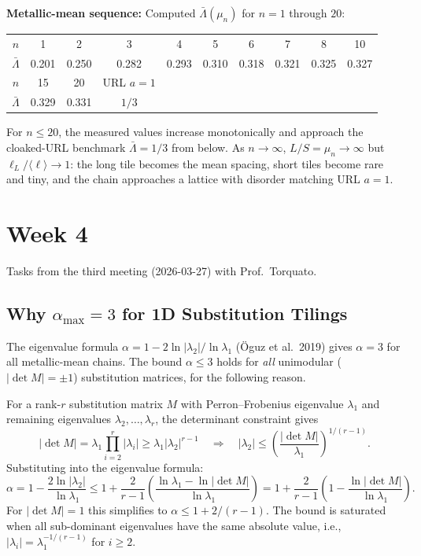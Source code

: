 \documentclass[11pt,letterpaper]{article}
\begin{document}
\textbf{Metallic-mean sequence:} Computed $\bar\Lambda(\mu_n)$ for $n = 1$ through $20$:

\noindent\begin{tabular}{cccccccccc}
\toprule
$n$ & 1 & 2 & 3 & 4 & 5 & 6 & 7 & 8 & 10 \\
$\bar\Lambda$ & 0.201 & 0.250 & 0.282 & 0.293 & 0.310 & 0.318 & 0.321 & 0.325 & 0.327 \\
\midrule
$n$ & 15 & 20 & URL $a{=}1$ & & & & & & \\
$\bar\Lambda$ & 0.329 & 0.331 & $1/3$ & & & & & & \\
\bottomrule
\end{tabular}

\vspace{0.2em}\noindent For $n \le 20$, the measured values increase monotonically and
approach the cloaked-URL benchmark $\bar\Lambda = 1/3$ from below. As $n \to \infty$, $L/S = \mu_n \to \infty$ but
$\ell_L/\langle\ell\rangle \to 1$: the long tile becomes the mean spacing, short tiles
become rare and tiny, and the chain approaches a lattice with disorder matching URL $a = 1$.

\section{Week 4}

Tasks from the third meeting (2026-03-27) with Prof.\ Torquato.

\subsection{Why $\alpha_{\max} = 3$ for 1D Substitution Tilings}

The eigenvalue formula $\alpha = 1 - 2\ln|\lambda_2|/\ln\lambda_1$ (Öguz et al.\ 2019)
gives $\alpha = 3$ for all metallic-mean chains. The bound $\alpha \leq 3$ holds
for \emph{all} unimodular ($|\det M| = \pm 1$) substitution matrices, for the following reason.

For a rank-$r$ substitution matrix $M$ with Perron--Frobenius eigenvalue $\lambda_1$
and remaining eigenvalues $\lambda_2, \ldots, \lambda_r$, the determinant constraint gives
\[
  |\det M| = \lambda_1 \prod_{i=2}^{r} |\lambda_i| \geq \lambda_1 |\lambda_2|^{r-1}
  \quad\Rightarrow\quad
  |\lambda_2| \leq \left(\frac{|\det M|}{\lambda_1}\right)^{1/(r-1)}.
\]
Substituting into the eigenvalue formula:
\[
  \alpha = 1 - \frac{2\ln|\lambda_2|}{\ln\lambda_1}
    \leq 1 + \frac{2}{r-1}\left(\frac{\ln\lambda_1 - \ln|\det M|}{\ln\lambda_1}\right)
    = 1 + \frac{2}{r-1}\left(1 - \frac{\ln|\det M|}{\ln\lambda_1}\right).
\]
For $|\det M| = 1$ this simplifies to $\alpha \leq 1 + 2/(r-1)$. The bound is saturated
when all sub-dominant eigenvalues have the same absolute value, i.e.,
$|\lambda_i| = \lambda_1^{-1/(r-1)}$ for $i \geq 2$.
\end{document}
